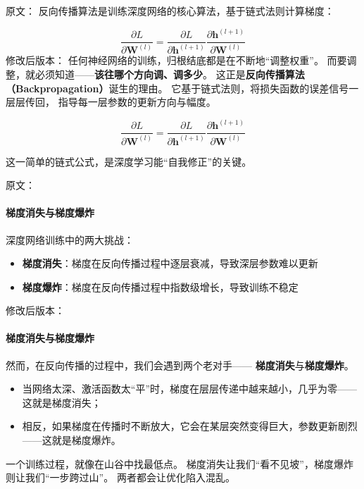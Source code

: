 原文：
反向传播算法是训练深度网络的核心算法，基于链式法则计算梯度：

$$\frac{\partial L}{\partial \mathbf{W}^{(l)}} = \frac{\partial L}{\partial \mathbf{h}^{(l+1)}} \frac{\partial \mathbf{h}^{(l+1)}}{\partial \mathbf{W}^{(l)}}$$
修改后版本：
任何神经网络的训练，归根结底都是在不断地“调整权重”。  
而要调整，就必须知道——\textbf{该往哪个方向调、调多少}。  
这正是\textbf{反向传播算法（Backpropagation）}诞生的理由。  
它基于链式法则，将损失函数的误差信号一层层传回，  
指导每一层参数的更新方向与幅度。

$$\frac{\partial L}{\partial \mathbf{W}^{(l)}} = \frac{\partial L}{\partial \mathbf{h}^{(l+1)}} \frac{\partial \mathbf{h}^{(l+1)}}{\partial \mathbf{W}^{(l)}}$$

这一简单的链式公式，是深度学习能“自我修正”的关键。



原文：
\paragraph{梯度消失与梯度爆炸}
深度网络训练中的两大挑战：

\begin{itemize}
\item \textbf{梯度消失}：梯度在反向传播过程中逐层衰减，导致深层参数难以更新
\item \textbf{梯度爆炸}：梯度在反向传播过程中指数级增长，导致训练不稳定
\end{itemize}
修改后版本：
\paragraph{梯度消失与梯度爆炸}  
然而，在反向传播的过程中，我们会遇到两个老对手——  
\textbf{梯度消失}与\textbf{梯度爆炸}。

\begin{itemize}
\item 当网络太深、激活函数太“平”时，梯度在层层传递中越来越小，几乎为零——这就是梯度消失；
\item 相反，如果梯度在传播时不断放大，它会在某层突然变得巨大，参数更新剧烈——这就是梯度爆炸。
\end{itemize}

一个训练过程，就像在山谷中找最低点。  
梯度消失让我们“看不见坡”，梯度爆炸则让我们“一步跨过山”。  
两者都会让优化陷入混乱。



